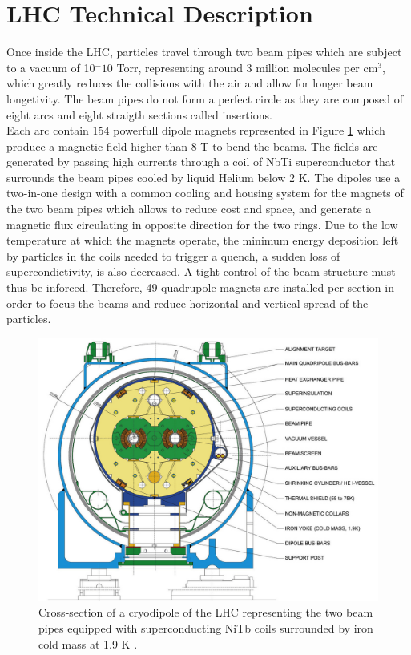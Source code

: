   \section{LHC Technical Description}

    Once inside the LHC, particles travel through two beam pipes which are subject to a vacuum of 10$^-10$ Torr, representing around 3 million molecules per cm$^3$, which greatly reduces the collisions with the air and allow for longer beam longetivity. The beam pipes do not form a perfect circle as they are composed of eight arcs and eight straigth sections called insertions. \\

    Each arc contain 154 powerfull dipole magnets represented in Figure \ref{fig:I-2-magnet} which produce a magnetic field higher than 8 T to bend the beams. The fields are generated by passing high currents through a coil of NbTi superconductor that surrounds the beam pipes cooled by liquid Helium below 2 K. The dipoles use a two-in-one design with a common cooling and housing system for the magnets of the two beam pipes which allows to reduce cost and space, and generate a magnetic flux circulating in opposite direction for the two rings. Due to the low temperature at which the magnets operate, the minimum energy deposition left by particles in the coils needed to trigger a quench, a sudden loss of supercondictivity, is also decreased. A tight control of the beam structure must thus be inforced. Therefore, 49 quadrupole magnets are installed per section in order to focus the beams and reduce horizontal and vertical spread of the particles. \\

    \begin{figure}[h!]
			\centering
			\includegraphics[width=\textwidth]{img/I-2-LHC/magnet.jpg}
			\caption{Cross-section of a cryodipole of the LHC representing the two beam pipes equipped with superconducting NiTb coils surrounded by iron cold mass at 1.9 K \cite{Evans:2008zzb}.}
			\label{fig:I-2-magnet}
		\end{figure}

